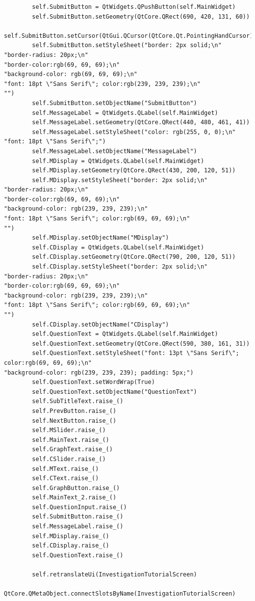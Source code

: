 \documentclass{article}
\begin{document}
\begin{lstlisting}
        self.SubmitButton = QtWidgets.QPushButton(self.MainWidget)
        self.SubmitButton.setGeometry(QtCore.QRect(690, 420, 131, 60))
        self.SubmitButton.setCursor(QtGui.QCursor(QtCore.Qt.PointingHandCursor))
        self.SubmitButton.setStyleSheet("border: 2px solid;\n"
"border-radius: 20px;\n"
"border-color:rgb(69, 69, 69);\n"
"background-color: rgb(69, 69, 69);\n"
"font: 18pt \"Sans Serif\"; color:rgb(239, 239, 239);\n"
"")
        self.SubmitButton.setObjectName("SubmitButton")
        self.MessageLabel = QtWidgets.QLabel(self.MainWidget)
        self.MessageLabel.setGeometry(QtCore.QRect(440, 480, 461, 41))
        self.MessageLabel.setStyleSheet("color: rgb(255, 0, 0);\n"
"font: 18pt \"Sans Serif\";")
        self.MessageLabel.setObjectName("MessageLabel")
        self.MDisplay = QtWidgets.QLabel(self.MainWidget)
        self.MDisplay.setGeometry(QtCore.QRect(430, 200, 120, 51))
        self.MDisplay.setStyleSheet("border: 2px solid;\n"
"border-radius: 20px;\n"
"border-color:rgb(69, 69, 69);\n"
"background-color: rgb(239, 239, 239);\n"
"font: 18pt \"Sans Serif\"; color:rgb(69, 69, 69);\n"
"")
        self.MDisplay.setObjectName("MDisplay")
        self.CDisplay = QtWidgets.QLabel(self.MainWidget)
        self.CDisplay.setGeometry(QtCore.QRect(790, 200, 120, 51))
        self.CDisplay.setStyleSheet("border: 2px solid;\n"
"border-radius: 20px;\n"
"border-color:rgb(69, 69, 69);\n"
"background-color: rgb(239, 239, 239);\n"
"font: 18pt \"Sans Serif\"; color:rgb(69, 69, 69);\n"
"")
        self.CDisplay.setObjectName("CDisplay")
        self.QuestionText = QtWidgets.QLabel(self.MainWidget)
        self.QuestionText.setGeometry(QtCore.QRect(590, 380, 161, 31))
        self.QuestionText.setStyleSheet("font: 13pt \"Sans Serif\"; color:rgb(69, 69, 69);\n"
"background-color: rgb(239, 239, 239); padding: 5px;")
        self.QuestionText.setWordWrap(True)
        self.QuestionText.setObjectName("QuestionText")
        self.SubTitleText.raise_()
        self.PrevButton.raise_()
        self.NextButton.raise_()
        self.MSlider.raise_()
        self.MainText.raise_()
        self.GraphText.raise_()
        self.CSlider.raise_()
        self.MText.raise_()
        self.CText.raise_()
        self.GraphButton.raise_()
        self.MainText_2.raise_()
        self.QuestionInput.raise_()
        self.SubmitButton.raise_()
        self.MessageLabel.raise_()
        self.MDisplay.raise_()
        self.CDisplay.raise_()
        self.QuestionText.raise_()

        self.retranslateUi(InvestigationTutorialScreen)
        QtCore.QMetaObject.connectSlotsByName(InvestigationTutorialScreen)


\end{lstlisting}
\end{document}

